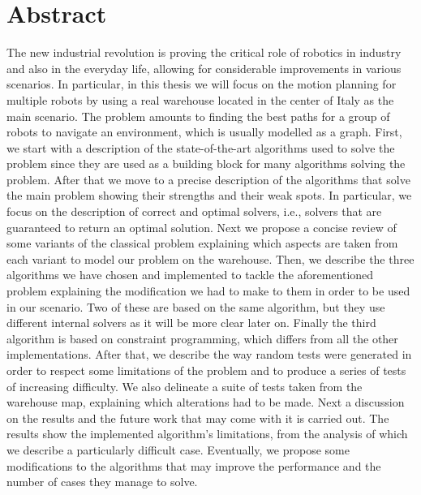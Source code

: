 \chapter{Abstract}
\label{ch:abstract}
The new industrial revolution is proving the critical role of robotics in
industry and also in the everyday life, allowing for considerable
improvements in various scenarios. In particular, in this thesis we will focus
on the motion planning for multiple robots by using a real warehouse located in
the center of Italy as the main scenario. \newline
The  problem amounts to finding the best paths for a group of
robots to navigate an environment, which is usually modelled as a graph.
First, we start with a description of the state-of-the-art algorithms used to
solve the  problem since they are used as a building block for many
algorithms solving the  problem. After that we move to a precise
description of the algorithms that solve the main problem showing their
strengths and their weak spots. In particular, we focus on the description of
correct and optimal solvers, i.e., solvers that are guaranteed to return an
optimal solution. Next we propose a concise review of some variants of the
classical  problem explaining which aspects are taken from each
variant to model our problem on the warehouse. \newline
Then, we describe the three algorithms we have chosen and implemented to tackle
the aforementioned problem explaining the modification we had to make to them
in order to be used in our scenario. Two of these
are based on the same  algorithm, but they use different
internal solvers as it will be more clear later on. Finally the third algorithm
is based on constraint programming, which differs from all the other
implementations. \newline
After that, we describe the way random tests were generated in order to respect
some limitations of the problem and to produce a series of tests of increasing
difficulty. We also delineate a suite of tests taken from the warehouse map,
explaining which alterations had to be made. \newline
Next a discussion on the results and the future work that may come with it
is carried out. The results show the implemented algorithm's limitations, from
the analysis of which we describe a particularly difficult case. Eventually, we
propose some modifications to the algorithms that may improve the performance
and the number of cases they manage to solve.
